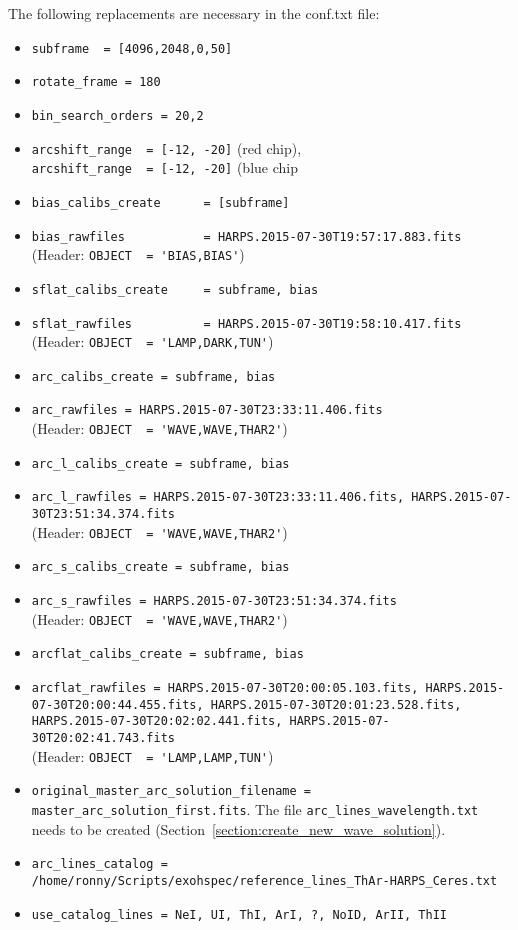 \documentclass[10pt,a4paper]{article}
\begin{document}
The following replacements are necessary in the conf.txt file:
\begin{itemize}
  \item \verb|subframe  = [4096,2048,0,50]|
  \item \verb|rotate_frame = 180|
  \item \verb|bin_search_orders = 20,2|
  \item \verb|arcshift_range  = [-12, -20]| (red chip),\\ \verb|arcshift_range  = [-12, -20]| (blue chip
  \item \verb|bias_calibs_create      = [subframe]|
  \item \verb|bias_rawfiles           = HARPS.2015-07-30T19:57:17.883.fits|\\ (Header: \verb|OBJECT  = 'BIAS,BIAS'|)
  \item \verb|sflat_calibs_create     = subframe, bias|
  \item \verb|sflat_rawfiles          = HARPS.2015-07-30T19:58:10.417.fits|\\ (Header: \verb|OBJECT  = 'LAMP,DARK,TUN'|)
  \item \verb|arc_calibs_create = subframe, bias|
  \item \verb|arc_rawfiles = HARPS.2015-07-30T23:33:11.406.fits|\\ (Header: \verb|OBJECT  = 'WAVE,WAVE,THAR2'|)
  \item \verb|arc_l_calibs_create = subframe, bias|
  \item \verb|arc_l_rawfiles = HARPS.2015-07-30T23:33:11.406.fits, HARPS.2015-07-30T23:51:34.374.fits|\\ (Header: \verb|OBJECT  = 'WAVE,WAVE,THAR2'|)
  \item \verb|arc_s_calibs_create = subframe, bias|
  \item \verb|arc_s_rawfiles = HARPS.2015-07-30T23:51:34.374.fits|\\ (Header: \verb|OBJECT  = 'WAVE,WAVE,THAR2'|)
  \item \verb|arcflat_calibs_create = subframe, bias|
  \item \verb|arcflat_rawfiles = HARPS.2015-07-30T20:00:05.103.fits, HARPS.2015-07-30T20:00:44.455.fits, HARPS.2015-07-30T20:01:23.528.fits, HARPS.2015-07-30T20:02:02.441.fits, HARPS.2015-07-30T20:02:41.743.fits|\\ (Header: \verb|OBJECT  = 'LAMP,LAMP,TUN'|)
  \item \verb|original_master_arc_solution_filename = master_arc_solution_first.fits|. The file \verb|arc_lines_wavelength.txt| needs to be created (Section~\ref{section:create_new_wave_solution}).
  \item \verb|arc_lines_catalog = /home/ronny/Scripts/exohspec/reference_lines_ThAr-HARPS_Ceres.txt|
  \item \verb|use_catalog_lines = NeI, UI, ThI, ArI, ?, NoID, ArII, ThII|
\end{itemize}
\end{document}
